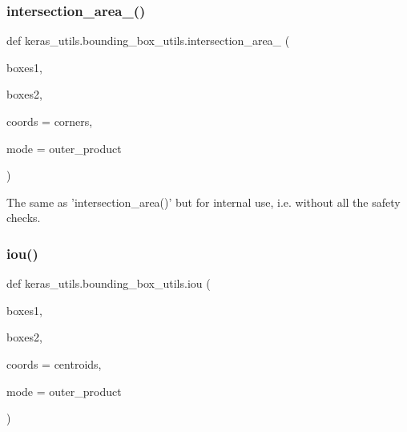 \subsubsection{\texorpdfstring{intersection\+\_\+area\+\_\+()}{intersection\_area\_()}}
{\footnotesize\ttfamily def keras\+\_\+utils.\+bounding\+\_\+box\+\_\+utils.\+intersection\+\_\+area\+\_\+ (\begin{DoxyParamCaption}\item[{}]{boxes1,  }\item[{}]{boxes2,  }\item[{}]{coords = {\ttfamily \textquotesingle{}corners\textquotesingle{}},  }\item[{}]{mode = {\ttfamily \textquotesingle{}outer\+\_\+product\textquotesingle{}} }\end{DoxyParamCaption})}

\begin{DoxyVerb}The same as 'intersection_area()' but for internal use, i.e. without all the safety checks.
\end{DoxyVerb}
 \mbox{\label{namespacekeras__utils_1_1bounding__box__utils_a2aa9711828ff2fd23f2769c95bfa3b52}} 
\subsubsection{\texorpdfstring{iou()}{iou()}}
{\footnotesize\ttfamily def keras\+\_\+utils.\+bounding\+\_\+box\+\_\+utils.\+iou (\begin{DoxyParamCaption}\item[{}]{boxes1,  }\item[{}]{boxes2,  }\item[{}]{coords = {\ttfamily \textquotesingle{}centroids\textquotesingle{}},  }\item[{}]{mode = {\ttfamily \textquotesingle{}outer\+\_\+product\textquotesingle{}} }\end{DoxyParamCaption})}

